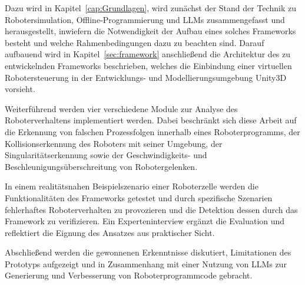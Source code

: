 Dazu wird in Kapitel~\ref{cap:Grundlagen}, wird zunächst der Stand
der Technik zu
Robotersimulation, Offline‑Programmierung und LLMs zusammengefasst und
herausgestellt, inwiefern die Notwendigkeit der Aufbau eines solches Frameworks
besteht und welche Rahmenbedingungen dazu zu beachten sind.
Darauf aufbauend wird in Kapitel~\ref{sec:framework} anschließend die
Architektur des zu
entwickelnden Frameworks beschrieben, welches die Einbindung einer
virtuellen Robotersteuerung in der Entwicklungs- und
Modellierungsumgebung Unity3D vorsieht.

Weiterführend werden vier verschiedene Module zur Analyse des Roboterverhaltens
implementiert werden. Dabei beschränkt sich diese Arbeit auf die Erkennung von
falschen Prozessfolgen innerhalb eines Roboterprogramms, der Kollisionserkennung
des Roboters mit seiner Umgebung, der Singularitätserkennung sowie der
Geschwindigkeits- und Beschleunigungsüberschreitung von Robotergelenken.

In einem realitätsnahen Beispielszenario einer Roboterzelle werden die
Funktionalitäten des Frameworks getestet und durch spezifische
Szenarien fehlerhaftes Roboterverhalten zu provozieren und die Detektion dessen
durch das Framework zu
verifizieren. Ein Experteninterview ergänzt die Evaluation und
reflektiert die Eignung des Ansatzes aus praktischer Sicht.

Abschließend werden die gewonnenen Erkenntnisse diskutiert, Limitationen
des Prototyps aufgezeigt und in Zusammenhang mit einer Nutzung von LLMs zur
Generierung und Verbesserung von Roboterprogrammcode gebracht.
